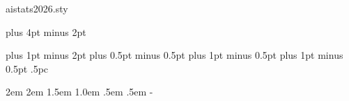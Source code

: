\begin{filecontents*}{aistats2026.sty}
\renewcommand{\headrulewidth}{0.5pt}


\renewenvironment{abstract}
{\@copyrightspace\centerline{\large\bfseries
Abstract}\vspace{0.5ex}\begin{quote}}{\par\end{quote}\vskip 1ex}

\def\section{\@startsection {section}{1}{\z@}{-2.0ex plus
    -0.5ex minus -.2ex}{1.5ex plus 0.3ex minus .2ex}{\large\bfseries\raggedright}}
\def\subsection{\@startsection{subsection}{2}{\z@}{-1.8ex plus
    -0.5ex minus -.2ex}{0.8ex plus .2ex}{\normalsize\bfseries\raggedright}}
\def\subsubsection{\@startsection{subsubsection}{3}{\z@}{-1.5ex plus
   -0.5ex minus -.2ex}{0.5ex plus .2ex}{\normalsize\bfseries\raggedright}}
\def\paragraph{\@startsection{paragraph}{4}{\z@}{1.5ex plus
   0.5ex minus .2ex}{-1em}{\normalsize\bfseries}}
\def\subparagraph{\@startsection{subparagraph}{5}{\z@}{1.5ex plus
   0.5ex minus .2ex}{-1em}{\normalsize\bfseries}}
\def\subsubsubsection{\vskip 5pt{\noindent\normalsize\rm\raggedright}}


\footnotesep 6.65pt %
\skip\footins 9pt plus 4pt minus 2pt
\def\footnoterule{\kern-3pt \hrule width 5pc \kern 2.6pt }
\setcounter{footnote}{0}

\parindent 0pt
\topsep 4pt plus 1pt minus 2pt
\partopsep 1pt plus 0.5pt minus 0.5pt
\itemsep 2pt plus 1pt minus 0.5pt
\parsep 2pt plus 1pt minus 0.5pt
\parskip .5pc


\leftmargin 2em \leftmargini\leftmargin \leftmarginii 2em
\leftmarginiii 1.5em \leftmarginiv 1.0em \leftmarginv .5em
\leftmarginvi .5em
\leftmargini\advance{}- {}


\end{filecontents*}
